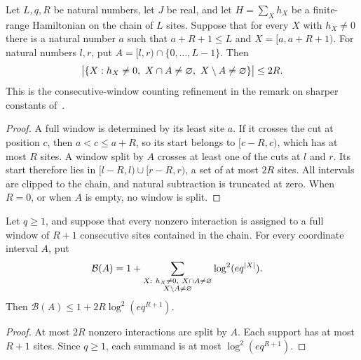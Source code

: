 \begin{lemma}
    \label{thm:chain_consecutive_window_count}
    \leanok
    Let $L,q,R$ be natural numbers, let $J$ be real, and let
    $H=\sum_X h_X$ be a finite-range Hamiltonian on the chain of $L$ sites.
    Suppose that for every $X$ with $h_X\ne0$ there is a natural number $a$
    such that $a+R+1\le L$ and $X=[a,a+R+1)$.
    For natural numbers $l,r$, put $A=[l,r)\cap\{0,\ldots,L-1\}$. Then
    \begin{align}
        \bigl|\{X:h_X\ne0,\ X\cap A\ne\varnothing,
        \ X\setminus A\ne\varnothing\}\bigr|\le2R.\notag
    \end{align}
    This is the consecutive-window counting refinement in the remark on
    sharper constants of~\cite[Part~I]{TNLean2026OneDimensional}.
\end{lemma}
\begin{proof}
    \leanok
    A full window is determined by its least site $a$. If it crosses the cut
    at position $c$, then $a<c\le a+R$, so its start belongs to $[c-R,c)$,
    which has at most $R$ sites. A window split by $A$ crosses at least one
    of the cuts at $l$ and $r$. Its start therefore lies in
    $[l-R,l)\cup{[r-R,r)}$, a set of at most $2R$ sites. All intervals are
    clipped to the chain, and natural subtraction is truncated at zero.
    When $R=0$, or when $A$ is empty, no window is split.
\end{proof}

\begin{lemma}
    \label{thm:chain_window_cut_budget}
    \leanok
    Let $q\ge1$, and suppose that every nonzero interaction is assigned to
    a full window of $R+1$ consecutive sites contained in the chain.
    For every coordinate interval $A$, put
    \begin{align}
        \mathcal B(A)
         & =1+\sum_{\substack{X:\ h_X\ne0,\ X\cap A\ne\varnothing \\
                X\setminus A\ne\varnothing}}
        \log^2(e q^{|X|}).\notag
    \end{align}
    Then $\mathcal B(A)\le1+2R\log^2(e q^{R+1})$.
\end{lemma}
\begin{proof}
    \leanok
    At most $2R$ nonzero interactions are split by $A$. Each support has
    at most $R+1$ sites. Since $q\ge1$, each summand is at most
    $\log^2(e q^{R+1})$.
\end{proof}

